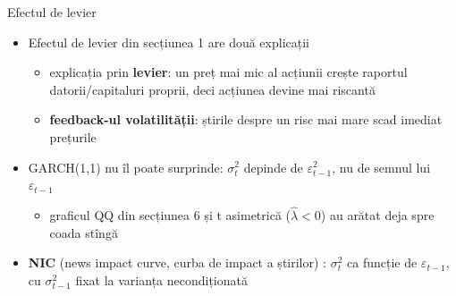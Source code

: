 \begin{frame}{Efectul de levier}
\itemsize{\small}
\begin{itemize}
    \item Efectul de levier din secțiunea 1  are două explicații
    \begin{itemize}
        \item explicația prin \textbf{levier}: un preț mai mic al acțiunii crește raportul datorii/capitaluri proprii, deci acțiunea devine mai riscantă
        \item \textbf{feedback-ul volatilității}: știrile despre un risc mai mare scad imediat prețurile
    \end{itemize}
    \item GARCH(1,1) nu îl poate surprinde: $\sigma_t^2$ depinde de $\varepsilon_{t-1}^2$, nu de semnul lui $\varepsilon_{t-1}$
    \begin{itemize}
        \item graficul QQ din secțiunea 6 și t asimetrică ($\hat\lambda < 0$) au arătat deja spre coada stîngă
    \end{itemize}
    \item \textbf{NIC} (news impact curve, curba de impact a știrilor) : $\sigma_t^2$ ca funcție de $\varepsilon_{t-1}$, cu $\sigma_{t-1}^2$ fixat la varianța necondiționată
\end{itemize}
\end{frame}


